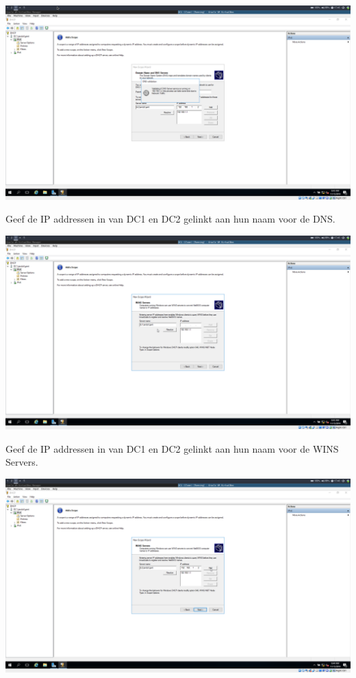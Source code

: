 \documentclass[a4paper]{article}
\begin{document}
\begin{center}
	\includegraphics[width=15cm]{Pictures/DC1/DHCP/1542300195.png}
	
	Geef de IP addressen in van DC1 en DC2 gelinkt aan hun naam voor de DNS.	
\end{center}
\begin{center}
	\includegraphics[width=15cm]{Pictures/DC1/DHCP/1542300229.png}
	
	Geef de IP addressen in van DC1 en DC2 gelinkt aan hun naam voor de WINS Servers.	
\end{center}
\begin{center}
	\includegraphics[width=15cm]{Pictures/DC1/DHCP/1542300240.png}
\end{center}
\end{document}
